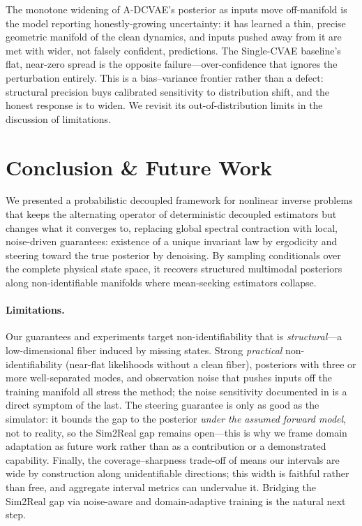 \documentclass{article} %
\begin{document}
The monotone widening of A-DCVAE's posterior as inputs move off-manifold is the model reporting honestly-growing uncertainty: it has learned a thin, precise geometric manifold of the clean dynamics, and inputs pushed away from it are met with wider, not falsely confident, predictions. The Single-CVAE baseline's flat, near-zero spread is the opposite failure---over-confidence that ignores the perturbation entirely. This is a bias--variance frontier rather than a defect: structural precision buys calibrated sensitivity to distribution shift, and the honest response is to widen. We revisit its out-of-distribution limits in the discussion of limitations.

\section{Conclusion \& Future Work}
\label{sec:conclusion}
We presented a probabilistic decoupled framework for nonlinear inverse problems that keeps the alternating operator of deterministic decoupled estimators but changes what it converges to, replacing global spectral contraction with local, noise-driven guarantees: existence of a unique invariant law by ergodicity and steering toward the true posterior by denoising. By sampling conditionals over the complete physical state space, it recovers structured multimodal posteriors along non-identifiable manifolds where mean-seeking estimators collapse.

\paragraph{Limitations.}
Our guarantees and experiments target non-identifiability that is \emph{structural}---a low-dimensional fiber induced by missing states. Strong \emph{practical} non-identifiability (near-flat likelihoods without a clean fiber), posteriors with three or more well-separated modes, and observation noise that pushes inputs off the training manifold all stress the method; the noise sensitivity documented in  is a direct symptom of the last. The steering guarantee is only as good as the simulator: it bounds the gap to the posterior \emph{under the assumed forward model}, not to reality, so the Sim2Real gap remains open---this is why we frame domain adaptation as future work rather than as a contribution or a demonstrated capability. Finally, the coverage--sharpness trade-off of  means our intervals are wide by construction along unidentifiable directions; this width is faithful rather than free, and aggregate interval metrics can undervalue it. Bridging the Sim2Real gap via noise-aware and domain-adaptive training is the natural next step.




\appendix


\end{document}
